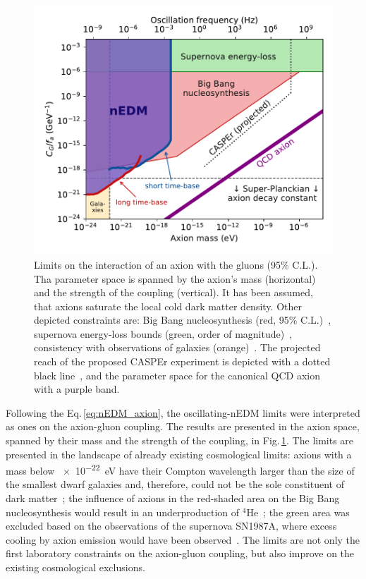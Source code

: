\begin{figure}
  \centering
  \includegraphics[width=\linewidth]{gfx/axions/psi_ill_axion_limits_v7.pdf}
  \caption{Limits on the interaction of an axion with the gluons (95\% C.L.). Tha parameter space is spanned by the axion's mass (horizontal) and the strength of the coupling (vertical). It has been assumed, that axions saturate the local cold dark matter density. Other depicted constraints are: Big Bang nucleosynthesis (red, 95\% C.L.)~\cite{Blum2014,StadnikThesis,Stadnik2015D}, supernova energy-loss bounds (green, order of magnitude)~\cite{Graham2013,Raffelt1990Review,Raffelt2008LNP}, consistency with observations of galaxies (orange)~\cite{Marsh2015Review,Marsh2015B,Schive2015,Marsh2017}. The projected reach of the proposed CASPEr experiment is depicted with a dotted black line~\cite{CASPEr2014}, and the parameter space for the canonical QCD axion with a purple band.}
\label{fig:axions_limits_coupling}
\end{figure}

Following the Eq.\,\ref{eq:nEDM_axion}, the oscillating-nEDM limits were interpreted as ones on the axion-gluon coupling. The results are presented in the axion space, spanned by their mass and the strength of the coupling, in Fig.\,\ref{fig:axions_limits_coupling}. The limits are presented in the landscape of already existing cosmological limits: axions with a mass below \SI{e-22}{\electronvolt} have their Compton wavelength larger than the size of the smallest dwarf galaxies and, therefore, could not be the sole constituent of dark matter~\cite{Marsh2015Review}; the influence of axions in the red-shaded area on the Big Bang nucleosynthesis would result in an underproduction of ${}^4$He~\cite{Blum2014}; the green area was excluded based on the observations of the supernova SN1987A, where excess cooling by axion emission would have been observed~\cite{Graham2013}. The limits are not only the first laboratory constraints on the axion-gluon coupling, but also improve on the existing cosmological exclusions.




